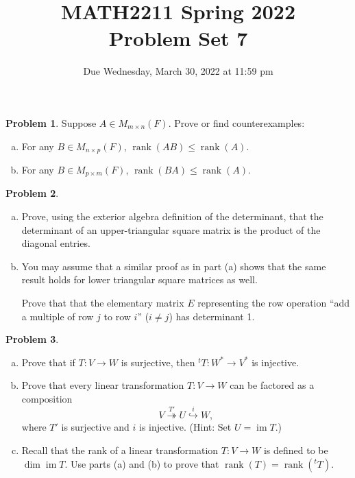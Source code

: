 \documentclass[11pt,oneside]{amsart}
\title{MATH2211 Spring 2022\\
Problem Set 7}
\author{Due Wednesday, March 30, 2022 at 11:59 pm}
\theoremstyle{definition}
\newtheorem{problem}{Problem}
\DeclareMathOperator{\im}{im}
\DeclareMathOperator{\rank}{rank}
\begin{document}
    \maketitle
    
    \begin{problem}
        Suppose $A\in M_{m\times n}(F)$. Prove or find counterexamples:
        \begin{enumerate}[(a)]
            \item For any $B\in M_{n\times p}(F)$, $\rank(AB)\leq\rank(A)$.
            \item For any $B\in M_{p\times m}(F)$, $\rank(BA)\leq\rank(A)$.
        \end{enumerate}
    \end{problem}

    \begin{problem}
        \leavevmode\begin{enumerate}[(a)]
            \item Prove, using the exterior algebra definition of the determinant, that the determinant of an upper-triangular square matrix is the product of the diagonal entries.
            \item You may assume that a similar proof as in part (a) shows that the same result holds for lower triangular square matrices as well.
            
            Prove that that the elementary matrix $E$ representing the row operation ``add a multiple of row $j$ to row $i$'' ($i\neq j$) has determinant 1.
        \end{enumerate}
    \end{problem}

    \begin{problem}
        \leavevmode\begin{enumerate}[(a)]
            \item Prove that if $T\colon V\to W$ is surjective, then $^tT\colon W^*\to V^*$ is injective.
            \item Prove that every linear transformation $T\colon V\to W$ can be factored as a composition
            \[V\overset{T'}{\twoheadrightarrow} U\overset{i}{\hookrightarrow}W,\]
            where $T'$ is surjective and $i$ is injective. (Hint: Set $U=\im T$.)
            \item Recall that the rank of a linear transformation $T\colon V\to W$ is defined to be $\dim\im T$. Use parts (a) and (b) to prove that $\rank(T)=\rank(^tT)$.
        \end{enumerate}
    \end{problem}
\end{document}
